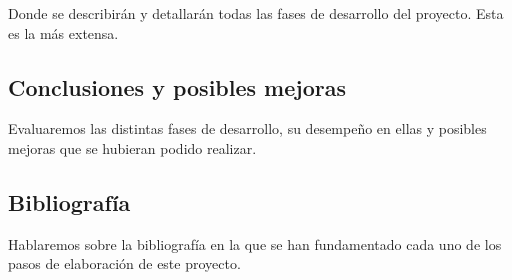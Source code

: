Donde se describirán y detallarán todas las fases de desarrollo del proyecto. Esta es la más extensa.

\subsection{Conclusiones y posibles mejoras}

Evaluaremos las distintas fases de desarrollo, su desempeño en ellas y posibles mejoras que se hubieran podido realizar.

\subsection{Bibliografía}

Hablaremos sobre la bibliografía en la que se han fundamentado cada uno de los pasos de elaboración de este proyecto.

